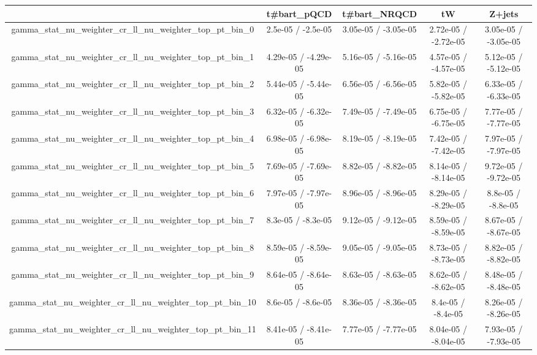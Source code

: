 \documentclass[10pt]{article}
\begin{document}
\begin{table}[htbp]
\begin{center}
\begin{tabular}{|c|c|c|c|c|}
\hline 
      & t#bar{t}_{pQCD}      & t#bar{t}_{NRQCD}      & tW      & Z+jets \\ 
\hline 
  gamma_stat_nu_weighter_cr_ll_nu_weighter_top_pt_bin_0 & 2.5e-05 / -2.5e-05 & 3.05e-05 / -3.05e-05 & 2.72e-05 / -2.72e-05 & 3.05e-05 / -3.05e-05 \\ 
  gamma_stat_nu_weighter_cr_ll_nu_weighter_top_pt_bin_1 & 4.29e-05 / -4.29e-05 & 5.16e-05 / -5.16e-05 & 4.57e-05 / -4.57e-05 & 5.12e-05 / -5.12e-05 \\ 
  gamma_stat_nu_weighter_cr_ll_nu_weighter_top_pt_bin_2 & 5.44e-05 / -5.44e-05 & 6.56e-05 / -6.56e-05 & 5.82e-05 / -5.82e-05 & 6.33e-05 / -6.33e-05 \\ 
  gamma_stat_nu_weighter_cr_ll_nu_weighter_top_pt_bin_3 & 6.32e-05 / -6.32e-05 & 7.49e-05 / -7.49e-05 & 6.75e-05 / -6.75e-05 & 7.77e-05 / -7.77e-05 \\ 
  gamma_stat_nu_weighter_cr_ll_nu_weighter_top_pt_bin_4 & 6.98e-05 / -6.98e-05 & 8.19e-05 / -8.19e-05 & 7.42e-05 / -7.42e-05 & 7.97e-05 / -7.97e-05 \\ 
  gamma_stat_nu_weighter_cr_ll_nu_weighter_top_pt_bin_5 & 7.69e-05 / -7.69e-05 & 8.82e-05 / -8.82e-05 & 8.14e-05 / -8.14e-05 & 9.72e-05 / -9.72e-05 \\ 
  gamma_stat_nu_weighter_cr_ll_nu_weighter_top_pt_bin_6 & 7.97e-05 / -7.97e-05 & 8.96e-05 / -8.96e-05 & 8.29e-05 / -8.29e-05 & 8.8e-05 / -8.8e-05 \\ 
  gamma_stat_nu_weighter_cr_ll_nu_weighter_top_pt_bin_7 & 8.3e-05 / -8.3e-05 & 9.12e-05 / -9.12e-05 & 8.59e-05 / -8.59e-05 & 8.67e-05 / -8.67e-05 \\ 
  gamma_stat_nu_weighter_cr_ll_nu_weighter_top_pt_bin_8 & 8.59e-05 / -8.59e-05 & 9.05e-05 / -9.05e-05 & 8.73e-05 / -8.73e-05 & 8.82e-05 / -8.82e-05 \\ 
  gamma_stat_nu_weighter_cr_ll_nu_weighter_top_pt_bin_9 & 8.64e-05 / -8.64e-05 & 8.63e-05 / -8.63e-05 & 8.62e-05 / -8.62e-05 & 8.48e-05 / -8.48e-05 \\ 
  gamma_stat_nu_weighter_cr_ll_nu_weighter_top_pt_bin_10 & 8.6e-05 / -8.6e-05 & 8.36e-05 / -8.36e-05 & 8.4e-05 / -8.4e-05 & 8.26e-05 / -8.26e-05 \\ 
  gamma_stat_nu_weighter_cr_ll_nu_weighter_top_pt_bin_11 & 8.41e-05 / -8.41e-05 & 7.77e-05 / -7.77e-05 & 8.04e-05 / -8.04e-05 & 7.93e-05 / -7.93e-05 \\ 

\end{tabular}
\end{center}
\end{table}
\end{document}
